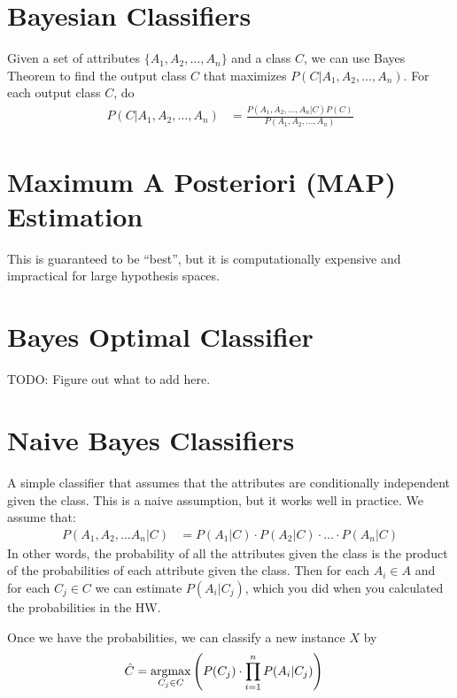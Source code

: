 \documentclass[10pt]{report}
\begin{document}
\section{Bayesian Classifiers}
Given a set of attributes $\{A_1, A_2, \ldots, A_n\}$ and a class $C$, we can use Bayes Theorem to find the output class $C$ that maximizes $P(C | A_1, A_2, \ldots, A_n)$. For each output class $C$, do
\begin{align*}
  P(C | A_1, A_2, \ldots, A_n) &= \frac{P(A_1, A_2, \ldots, A_n | C)P(C)}{P(A_1, A_2, \ldots, A_n)}
\end{align*}
\section{Maximum A Posteriori (MAP) Estimation}
This is guaranteed to be ``best'', but it is computationally expensive and impractical for large hypothesis spaces.
\section{Bayes Optimal Classifier}
TODO: Figure out what to add here.
\section{Naive Bayes Classifiers}
A simple classifier that assumes that the attributes are conditionally independent given the class. This is a naive assumption, but it works well in practice. We assume that:
\begin{align*}
  P(A_1, A_2, \ldots A_n | C) &= P(A_1 | C) \cdot P(A_2 | C) \cdot \ldots \cdot P(A_n | C)
\end{align*}
In other words, the probability of all the attributes given the class is the product of the probabilities of each attribute given the class. Then for each $A_i \in A$ and for each $C_j \in C$ we can estimate $P(A_i | C_j)$, which you did when you calculated the probabilities in the HW.

Once we have the probabilities, we can classify a new instance $X$ by
\begin{align*}
  \hat{C} &= \operatorname*{arg max}_{C_j \in C} \left(P(C_j) \cdot \prod_{i=1}^n P(A_i | C_j)\right)
\end{align*}
\end{document}

